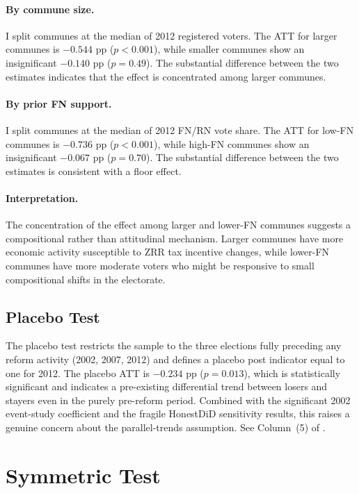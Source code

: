 \documentclass[12pt]{article}
\begin{document}
\paragraph{By commune size.} I split communes at the median of 2012 registered voters. The ATT for larger communes is $-0.544$ pp ($p < 0.001$), while smaller communes show an insignificant $-0.140$ pp ($p = 0.49$). The substantial difference between the two estimates indicates that the effect is concentrated among larger communes.

\paragraph{By prior FN support.} I split communes at the median of 2012 FN/RN vote share. The ATT for low-FN communes is $-0.736$ pp ($p < 0.001$), while high-FN communes show an insignificant $-0.067$ pp ($p = 0.70$). The substantial difference between the two estimates is consistent with a floor effect.

\paragraph{Interpretation.} The concentration of the effect among larger and lower-FN communes suggests a compositional rather than attitudinal mechanism. Larger communes have more economic activity susceptible to ZRR tax incentive changes, while lower-FN communes have more moderate voters who might be responsive to small compositional shifts in the electorate.

\subsection{Placebo Test}

The placebo test restricts the sample to the three elections fully preceding any reform activity (2002, 2007, 2012) and defines a placebo post indicator equal to one for 2012. The placebo ATT is $-0.234$ pp ($p = 0.013$), which is statistically significant and indicates a pre-existing differential trend between losers and stayers even in the purely pre-reform period. Combined with the significant 2002 event-study coefficient and the fragile HonestDiD sensitivity results, this raises a genuine concern about the parallel-trends assumption. See Column~(5) of .

\section{Symmetric Test} \label{app:symmetric}
\end{document}
